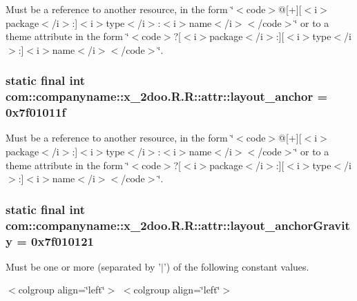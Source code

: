 Must be a reference to another resource, in the form \char`\"{}$<$code$>$@\mbox{[}+\mbox{]}\mbox{[}$<$i$>$package$<$/i$>$:\mbox{]}$<$i$>$type$<$/i$>$:$<$i$>$name$<$/i$>$$<$/code$>$\char`\"{} or to a theme attribute in the form \char`\"{}$<$code$>$?\mbox{[}$<$i$>$package$<$/i$>$:\mbox{]}\mbox{[}$<$i$>$type$<$/i$>$:\mbox{]}$<$i$>$name$<$/i$>$$<$/code$>$\char`\"{}. \hypertarget{classcom_1_1companyname_1_1x__2doo_1_1_r_1_1attr_8eb9d1dd9e5b3e4434376fe742103f27}{
\subsubsection[{layout\_\-anchor}]{\setlength{\rightskip}{0pt plus 5cm}static final int com::companyname::x\_\-2doo.R.R::attr::layout\_\-anchor = 0x7f01011f}}
\label{classcom_1_1companyname_1_1x__2doo_1_1_r_1_1attr_8eb9d1dd9e5b3e4434376fe742103f27}


Must be a reference to another resource, in the form \char`\"{}$<$code$>$@\mbox{[}+\mbox{]}\mbox{[}$<$i$>$package$<$/i$>$:\mbox{]}$<$i$>$type$<$/i$>$:$<$i$>$name$<$/i$>$$<$/code$>$\char`\"{} or to a theme attribute in the form \char`\"{}$<$code$>$?\mbox{[}$<$i$>$package$<$/i$>$:\mbox{]}\mbox{[}$<$i$>$type$<$/i$>$:\mbox{]}$<$i$>$name$<$/i$>$$<$/code$>$\char`\"{}. \hypertarget{classcom_1_1companyname_1_1x__2doo_1_1_r_1_1attr_13af8ea6287e01914090146ec92099f0}{
\subsubsection[{layout\_\-anchorGravity}]{\setlength{\rightskip}{0pt plus 5cm}static final int com::companyname::x\_\-2doo.R.R::attr::layout\_\-anchorGravity = 0x7f010121}}
\label{classcom_1_1companyname_1_1x__2doo_1_1_r_1_1attr_13af8ea6287e01914090146ec92099f0}


Must be one or more (separated by '$|$') of the following constant values. \begin{TabularC}{0}
\hline
\end{TabularC}
$<$colgroup align=\char`\"{}left\char`\"{}$>$ $<$colgroup align=\char`\"{}left\char`\"{}$>$ 


